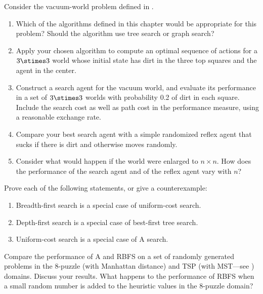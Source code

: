 \begin{exercise}%
\prgex
Consider the vacuum-world problem defined in .
\begin{enumerate}
\item Which of the algorithms defined in this chapter would be
appropriate for this problem? Should the algorithm use tree search or graph search?
\item Apply your chosen algorithm to compute an optimal sequence of actions for
a \(3\stimes 3\) world whose initial state has dirt in the three top squares
and the agent in the center.
\item Construct a search agent for the vacuum world, and evaluate its
performance in a set of \(3\stimes 3\) worlds with probability 0.2 of
dirt in each square. Include the search cost as well as path cost in
the performance measure, using a reasonable exchange rate.
\item Compare your best search agent with a simple randomized reflex agent that sucks if there is dirt and otherwise moves randomly.
\item Consider what would happen if the world were enlarged to
\(n \times n\). How does the performance of the search agent and of the reflex agent vary with
\(n\)?
\end{enumerate}
\end{exercise} 

\begin{exercise}
Prove each of the following statements, or give a counterexample:
\begin{enumerate}
\item Breadth-first search is a special case of uniform-cost search.
\item Depth-first search is a special case of best-first tree search.
\item Uniform-cost search is a special case of A{\star} search.
\end{enumerate}
\end{exercise} 



\begin{exercise}
\prgex Compare the performance of A{\star} and RBFS on a set of
randomly generated problems in the 8-puzzle (with Manhattan distance) and
TSP (with MST---see ) domains. Discuss 
your results. What happens to the performance of RBFS when a small
random number is added to the heuristic values in the 8-puzzle domain?
\end{exercise} 

